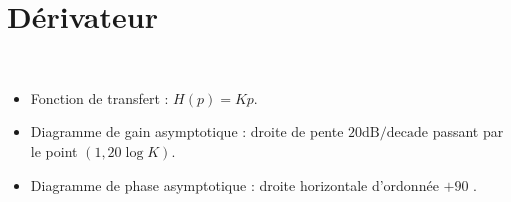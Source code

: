 \documentclass[10pt,fleqn]{article} %
\begin{document}
\section{Dérivateur}
\begin{resultat} ~\\

\vspace{-.5cm}

\noindent\begin{minipage}[c]{.53\linewidth}
\begin{itemize}
\item Fonction de transfert : $H(p)={K}{p}$.
\item Diagramme de gain asymptotique : droite de pente ${20}\text{dB/decade}$ passant par le point $(1,20\log K)$.
\item Diagramme de phase asymptotique : droite horizontale d'ordonnée $+90$ \degre.
\end{itemize}
\end{minipage} \hfill
\begin{minipage}[c]{.45\linewidth}
\end{minipage}
\end{resultat}
\end{document}
